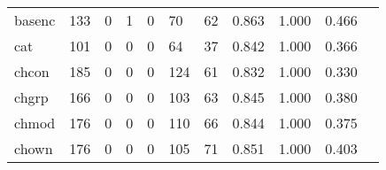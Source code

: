 \begin{longtable}{lp{1.2cm}p{1.2cm}p{1.2cm}p{1.2cm}p{1.2cm}p{1.2cm}p{1.2cm}p{1.2cm}p{1.2cm}p{1.2cm}}
basenc    &                                   133 &                                                  0 &                                                  1 &                                                  0 &                                                 70 &                                                 62 &                                              0.863 &                                              1.000 &                                              0.466 \\
cat       &                                   101 &                                                  0 &                                                  0 &                                                  0 &                                                 64 &                                                 37 &                                              0.842 &                                              1.000 &                                              0.366 \\
chcon     &                                   185 &                                                  0 &                                                  0 &                                                  0 &                                                124 &                                                 61 &                                              0.832 &                                              1.000 &                                              0.330 \\
chgrp     &                                   166 &                                                  0 &                                                  0 &                                                  0 &                                                103 &                                                 63 &                                              0.845 &                                              1.000 &                                              0.380 \\
chmod     &                                   176 &                                                  0 &                                                  0 &                                                  0 &                                                110 &                                                 66 &                                              0.844 &                                              1.000 &                                              0.375 \\
chown     &                                   176 &                                                  0 &                                                  0 &                                                  0 &                                                105 &                                                 71 &                                              0.851 &                                              1.000 &                                              0.403 \\

\end{longtable}
